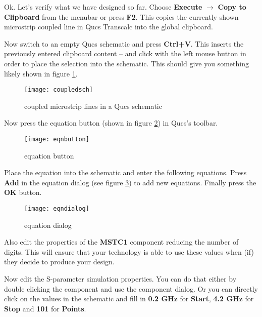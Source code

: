 
Ok.  Let's verify what we have designed so far.  Choose
\textbf{Execute} $\rightarrow$ \textbf{Copy to Clipboard} from the
menubar or press \textbf{F2}.  This copies the currently shown
microstrip coupled line in Qucs Transcalc into the global clipboard.

\addvspace{12pt}

Now switch to an empty Qucs schematic and press \textbf{Ctrl+V}.  This
inserts the previously entered clipboard content -- and click with the
left mouse button in order to place the selection into the schematic.
This should give you something likely shown in figure
\ref{fig:coupledsch}.

\begin{figure}[ht]
  \centering
  \texttt{[image: coupledsch]}
  \caption{coupled microstrip lines in a Qucs schematic}
  \label{fig:coupledsch}
\end{figure}
\FloatBarrier

Now press the equation button (shown in figure \ref{fig:eqnbutton}) in
Qucs's toolbar.

\begin{figure}[ht]
  \centering
  \texttt{[image: eqnbutton]}
  \caption{equation button}
  \label{fig:eqnbutton}
\end{figure}
\FloatBarrier

Place the equation into the schematic and enter the following
equations.  Press \textbf{Add} in the equation dialog (see figure
\ref{fig:eqndialog}) to add new equations.  Finally press the
\textbf{OK} button.

\begin{figure}[ht]
  \centering
  \texttt{[image: eqndialog]}
  \caption{equation dialog}
  \label{fig:eqndialog}
\end{figure}
\FloatBarrier

Also edit the properties of the \textbf{MSTC1} component reducing the
number of digits.  This will ensure that your technology is able to
use these values when (if) they decide to produce your design.

\addvspace{12pt}

Now edit the S-parameter simulation properties.  You can do that
either by double clicking the component and use the component dialog.
Or you can directly click on the values in the schematic and fill in
\textbf{0.2 GHz} for \textbf{Start}, \textbf{4.2 GHz} for
\textbf{Stop} and \textbf{101} for \textbf{Points}.

